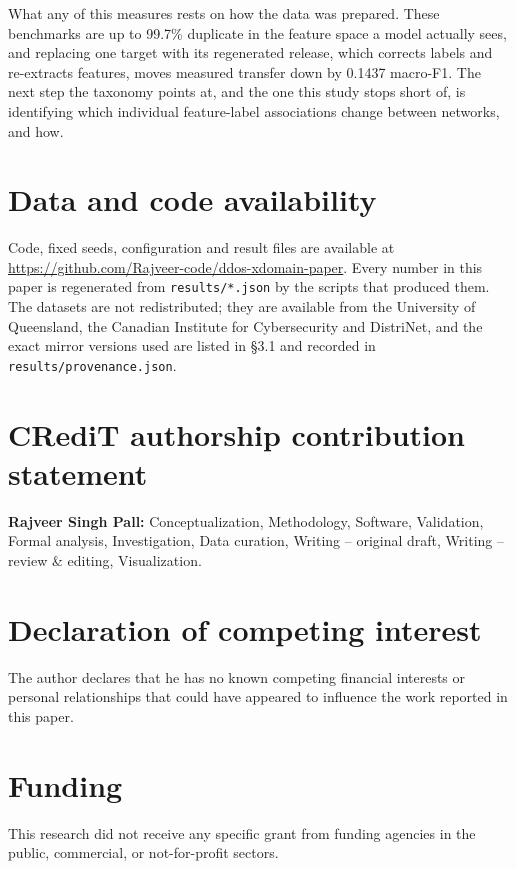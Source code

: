 \documentclass[preprint,12pt,nopreprintline]{elsarticle}
\begin{document}
What any of this measures rests on how the data was prepared. These benchmarks are up to 99.7\% duplicate in the feature space a model actually sees, and replacing one target with its regenerated release, which corrects labels and re-extracts features, moves measured transfer down by 0.1437 macro-F1. The next step the taxonomy points at, and the one this study stops short of, is identifying which individual feature-label associations change between networks, and how.


\section*{Data and code availability}

Code, fixed seeds, configuration and result files are available at \url{https://github.com/Rajveer-code/ddos-xdomain-paper}. Every number in this paper is regenerated from \texttt{results/*.json} by the scripts that produced them. The datasets are not redistributed; they are available from the University of Queensland, the Canadian Institute for Cybersecurity and DistriNet, and the exact mirror versions used are listed in \S{}3.1 and recorded in \texttt{results/provenance.json}.


\section*{CRediT authorship contribution statement}
\textbf{Rajveer Singh Pall:} Conceptualization, Methodology, Software, Validation, Formal
analysis, Investigation, Data curation, Writing -- original draft, Writing -- review \&
editing, Visualization.

\section*{Declaration of competing interest}
The author declares that he has no known competing financial interests or personal
relationships that could have appeared to influence the work reported in this paper.

\section*{Funding}
This research did not receive any specific grant from funding agencies in the public,
commercial, or not-for-profit sectors.
\end{document}
